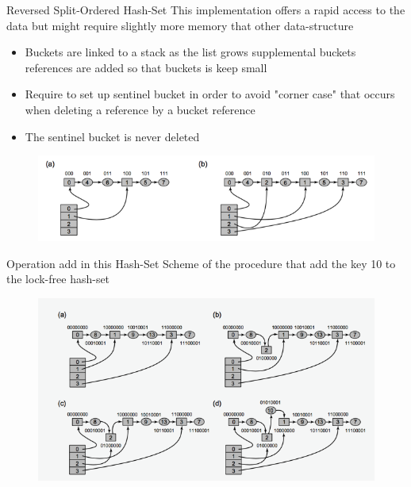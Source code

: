 \documentclass{bredelebeamer}
\begin{document}
     \begin{frame}{Reversed Split-Ordered Hash-Set}
        This implementation offers a rapid access to the data but might require slightly more memory that other data-structure
        \begin{itemize}
            \item Buckets are linked to a stack as the list grows supplemental buckets references are added so that buckets is keep small
            \item Require to set up sentinel bucket in order to avoid "corner case" that occurs when deleting a reference by a bucket reference
            \item The sentinel bucket is never deleted
        \end{itemize}
         \begin{figure}
             \centering
             \includegraphics{../report/images/hashsetFig1.png}
         \end{figure}
    \end{frame}

     \begin{frame}{Operation add in this Hash-Set}
         Scheme of the procedure that add the key 10 to the lock-free hash-set
         \begin{figure}
             \centering
             \includegraphics{../report/images/hashsetFig2.png}
         \end{figure}
    \end{frame}
\end{document}
